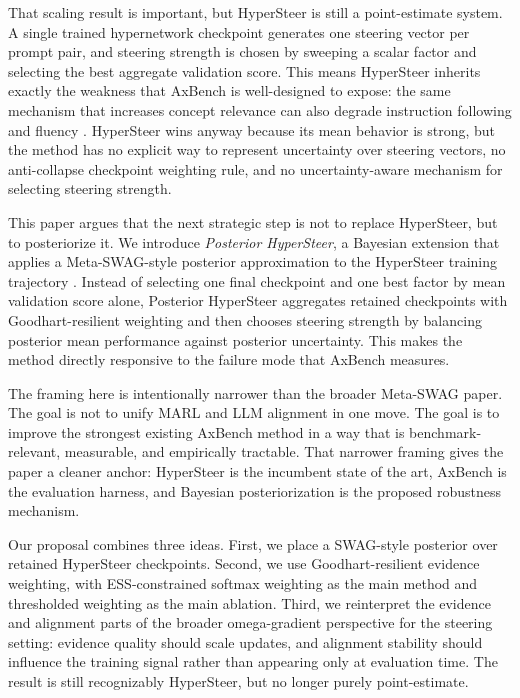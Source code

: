 \documentclass[10pt]{article}
\begin{document}
That scaling result is important, but HyperSteer is still a point-estimate system. A single trained hypernetwork checkpoint generates one steering vector per prompt pair, and steering strength is chosen by sweeping a scalar factor and selecting the best aggregate validation score. This means HyperSteer inherits exactly the weakness that AxBench is well-designed to expose: the same mechanism that increases concept relevance can also degrade instruction following and fluency \citep{wu2025axbench}. HyperSteer wins anyway because its mean behavior is strong, but the method has no explicit way to represent uncertainty over steering vectors, no anti-collapse checkpoint weighting rule, and no uncertainty-aware mechanism for selecting steering strength.

This paper argues that the next strategic step is not to replace HyperSteer, but to posteriorize it. We introduce \emph{Posterior HyperSteer}, a Bayesian extension that applies a Meta-SWAG-style posterior approximation to the HyperSteer training trajectory \citep{maddox2019swag}. Instead of selecting one final checkpoint and one best factor by mean validation score alone, Posterior HyperSteer aggregates retained checkpoints with Goodhart-resilient weighting and then chooses steering strength by balancing posterior mean performance against posterior uncertainty. This makes the method directly responsive to the failure mode that AxBench measures.

The framing here is intentionally narrower than the broader Meta-SWAG paper. The goal is not to unify MARL and LLM alignment in one move. The goal is to improve the strongest existing AxBench method in a way that is benchmark-relevant, measurable, and empirically tractable. That narrower framing gives the paper a cleaner anchor: HyperSteer is the incumbent state of the art, AxBench is the evaluation harness, and Bayesian posteriorization is the proposed robustness mechanism.

Our proposal combines three ideas. First, we place a SWAG-style posterior over retained HyperSteer checkpoints. Second, we use Goodhart-resilient evidence weighting, with ESS-constrained softmax weighting as the main method and thresholded weighting as the main ablation. Third, we reinterpret the evidence and alignment parts of the broader omega-gradient perspective for the steering setting: evidence quality should scale updates, and alignment stability should influence the training signal rather than appearing only at evaluation time. The result is still recognizably HyperSteer, but no longer purely point-estimate.
\end{document}
